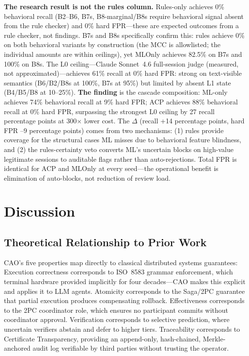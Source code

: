 \documentclass{article}
\begin{document}
\textbf{The research result is not the rules column.} Rules-only achieves 0\% behavioral recall (B2--B6, B7s, B8-marginal/B8s require behavioral signal absent from the rule checker) and 0\% hard FPR---these are expected outcomes from a rule checker, not findings. B7s and B8s specifically confirm this: rules achieve 0\% on both behavioral variants by construction (the MCC is allowlisted; the individual amounts are within ceilings), yet MLOnly achieves 82.5\% on B7s and 100\% on B8s. The L0 ceiling---Claude Sonnet~4.6 full-session judge (measured, not approximated)---achieves 61\% recall at 0\% hard FPR: strong on text-visible semantics (B6/B2/B8s at 100\%, B7s at 95\%) but limited by absent L1 state (B4/B5/B8 at 10--25\%). \textbf{The finding} is the cascade composition: ML-only achieves 74\% behavioral recall at 9\% hard FPR; ACP achieves 88\% behavioral recall at 0\% hard FPR, surpassing the strongest L0 ceiling by 27 recall percentage points at 300$\times$ lower cost. The $\Delta$ (recall +14 percentage points, hard FPR --9 percentage points) comes from two mechanisms: (1) rules provide coverage for the structural cases ML misses due to behavioral feature blindness, and (2) the rules-certainty veto converts ML's uncertain blocks on high-value legitimate sessions to auditable flags rather than auto-rejections. Total FPR is identical for ACP and MLOnly at every seed---the operational benefit is elimination of auto-blocks, not reduction of review load.

\section{Discussion}

\subsection{Theoretical Relationship to Prior Work}

CAO's five properties map directly to classical distributed systems guarantees: Execution correctness corresponds to ISO~8583 grammar enforcement, which terminal hardware provided implicitly for four decades---CAO makes this explicit and applies it to LLM agents. Atomicity corresponds to the Saga/2PC guarantee that partial execution produces compensating rollback. Effectiveness corresponds to the 2PC coordinator role, which ensures no participant commits without coordinator approval. Verification corresponds to selective prediction, where uncertain verifiers abstain and defer to higher tiers. Traceability corresponds to Certificate Transparency, providing an append-only, hash-chained, Merkle-anchored audit log verifiable by third parties without trusting the operator.
\end{document}
